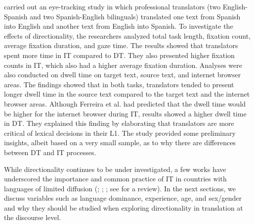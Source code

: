 \documentclass[output=paper]{langscibook}
\begin{document}
\citet{ferreira2016cognitive} carried out an eye-tracking study in which professional translators (two English-Spanish and two Spanish-English bilinguals) translated one text from Spanish into English and another text from English into Spanish. To investigate the effects of directionality, the researchers analyzed total task length, fixation count, average fixation duration, and gaze time. The results showed that translators spent more time in IT compared to DT. They also presented higher fixation counts in IT, which also had a higher average fixation duration. Analyses were also conducted on dwell time on target text, source text, and internet browser areas. The findings showed that in both tasks, translators tended to present longer dwell time in the source text compared to the target text and the internet browser areas. Although Ferreira et al. had predicted that the dwell time would be higher for the internet browser during IT, results showed a higher dwell time in DT. They explained this finding by elaborating that translators are more critical of lexical decisions in their L1. The study provided some preliminary insights, albeit based on a very small sample, as to why there are differences between DT and IT processes.

While directionality continues to be under investigated, a few works have underscored the importance and common practice of IT in countries with languages of limited diffusion (\citealt{pavlovic2010were}; \citealt{ferreira2013direcionalidade}; \citealt{whyatt2018old}; see \citealt{ferreira2017directionality} for a review). In the next sections, we discuss variables such as language dominance, experience, age, and sex/gender and why they should be studied when exploring directionality in translation at the discourse level. 
\end{document}
